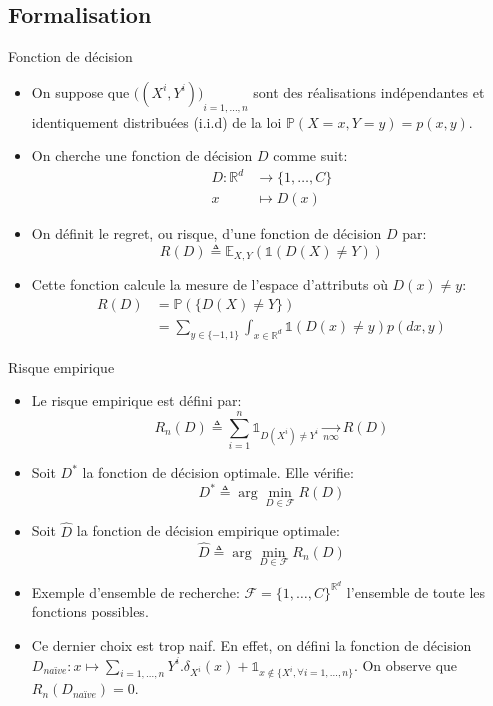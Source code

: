 \documentclass[8pt]{beamer}
\begin{document}
		\subsection{Formalisation}
			\begin{frame}{Fonction de décision}
				\begin{itemize}
					\item<1-> On suppose que ${\big((X^i, Y^i)\big)}_{i=1,\dots,n}$ sont des réalisations indépendantes et identiquement distribuées (i.i.d) de la loi $\mathbb{P}(X=x, Y=y) = p(x,y)$.
					\item<2-> On cherche une fonction de décision $D$ comme suit:
					\begin{align*}
						D: \mathbb{R}^d &\rightarrow \{1, \dots, C\} \\
						x &\mapsto D(x)
					\end{align*}
					\item<3-> On définit le regret, ou risque, d'une fonction de décision $D$ par:
					\begin{equation}
						R(D) \triangleq \mathbb{E}_{X,Y}(\mathbb{1}(D(X)\neq Y))
					\end{equation}
					\item<4-> Cette fonction calcule la mesure de l'espace d'attributs où $D(x) \neq y$:
					\begin{align*}
						R(D) &= \mathbb{P}(\{D(X)\neq Y\})\\
							&= \sum_{y\in \{-1, 1\}} \int_{x \in \mathbb{R}^d} \mathbb{1}(D(x)\neq y) p(dx, y)
					\end{align*}
				\end{itemize}
			\end{frame}
			\begin{frame}{Risque empirique}
				\begin{itemize}
					\item<1-> Le risque empirique est défini par:
						\begin{equation}
							R_n(D) \triangleq \sum_{i=1}^n \mathbb{1}_{D(X^i) \neq Y^i} \underset{n\infty}{\longrightarrow} R(D)
						\end{equation}
					\item<2-> Soit \(D^*\) la fonction de décision optimale. Elle vérifie:
						\begin{equation}
							D^* \triangleq \arg\min_{D \in \mathscr{F}} R(D)
						\end{equation}
					\item<3-> Soit \(\widehat D \) la fonction de décision empirique optimale:
						\begin{equation}
							\widehat D \triangleq \arg\min_{D \in \mathscr{F}} R_n(D)
						\end{equation}
					\item<3-> Exemple d'ensemble de recherche: \(\mathscr{F} = \{1, \dots, C\}^{\mathbb{R}^d}\) l'ensemble de toute les fonctions possibles.
					\item<4-> Ce dernier choix est trop naif. En effet, on défini la fonction de décision \(D_{naïve}: x \mapsto \sum_{i=1,\dots,n} Y^i . \delta_{X^i}(x) + \mathbb{1}_{x \notin \{X^i, \forall i=1,\dots,n\}}\). On observe que \(R_n(D_{naïve}) = 0\).
				\end{itemize}
			\end{frame}
\end{document}
